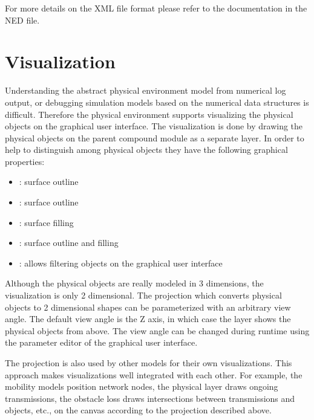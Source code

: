 For more details on the XML file format please refer to the documentation in the
 NED file.

\section{Visualization}

Understanding the abstract physical environment model from numerical log output,
or debugging simulation models based on the numerical data structures is
difficult. Therefore the physical environment supports visualizing the physical
objects on the graphical user interface. The visualization is done by drawing
the physical objects on the parent compound module as a separate layer. In order
to help to distinguish among physical objects they have the following graphical
properties:

\begin{itemize}
  \item {}: surface outline 
  \item {}: surface outline
  \item {}: surface filling 
  \item {}: surface outline and filling
  \item {}: allows filtering objects on the graphical user interface
\end{itemize}

Although the physical objects are really modeled in 3 dimensions, the
visualization is only 2 dimensional. The projection which converts physical
objects to 2 dimensional shapes can be parameterized with an arbitrary view
angle. The default view angle is the Z axis, in which case the layer shows the
physical objects from above. The view angle can be changed during runtime using
the parameter editor of the graphical user interface.

The projection is also used by other models for their own visualizations. This
approach makes visualizations well integrated with each other. For example, the
mobility models position network nodes, the physical layer draws ongoing
transmissions, the obstacle loss draws intersections between transmissions and
objects, etc., on the canvas according to the projection described above. 


